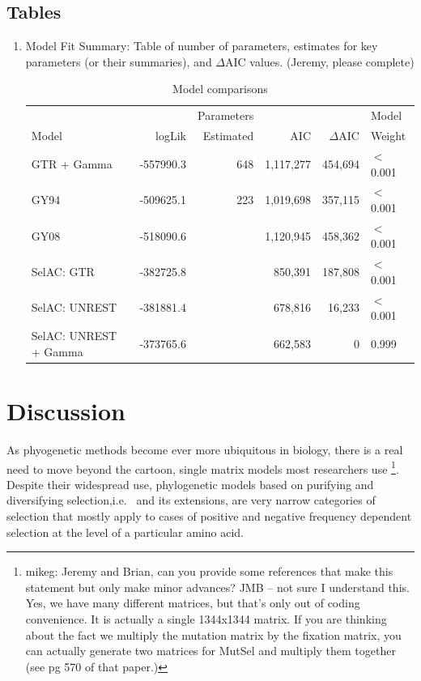 \documentclass{article}
\newcommand{\DeltaAIC}{\ensuremath{\Delta\text{AIC}}\xspace}
\begin{document}
\subsection*{Tables}
\begin{enumerate}
\item Model Fit Summary:
  Table of number of parameters,
  estimates for key parameters (or their summaries), and \DeltaAIC
  values.
  (Jeremy, please complete)
  \begin{table}
    \begin{tabular}{lrrrrl}
      &          &Parameters &          &        & Model\\
      Model                 & logLik   & Estimated &     AIC& \DeltaAIC&  Weight\\\hline
      GTR + Gamma           & -557990.3&        648& 1,117,277& 454,694&$<$0.001\\
      GY94                  & -509625.1&        223& 1,019,698& 357,115&$<$0.001\\
      GY08                  & -518090.6&           & 1,120,945& 458,362&$<$0.001\\
      SelAC: GTR            & -382725.8&           &   850,391& 187,808&$<$0.001\\
      SelAC: UNREST         & -381881.4&           &   678,816&  16,233&$<$0.001\\
      SelAC: UNREST + Gamma & -373765.6&           &   662,583&       0& 0.999
    \end{tabular}
    \caption{Model comparisons}\label{table:modelFits}
  \end{table}
\end{enumerate}
\section*{Discussion}
As phyogenetic methods become ever more ubiquitous in biology, there is a real need to move beyond the cartoon, single matrix models most researchers use \citep{GoldmanEtAl1996,ThorneEtAl1996,GoldmanEtAl1998,HalpernAndBruno1998}
  \footnote{mikeg: Jeremy and Brian, can you provide some references that make this statement but only make minor advances? JMB -- not sure I understand this. Yes, we have many different matrices, but that's only out of coding convenience. It is actually a single 1344x1344 matrix. If you are thinking about the fact we multiply the mutation matrix by the fixation matrix, you can actually generate two matrices for MutSel and multiply them together (see pg 570 of that paper.)}.
Despite their widespread use, phylogenetic models based on purifying and diversifying selection,i.e.~\citet{GoldmanAndYang1994} and its extensions, are very narrow categories of selection that mostly apply to cases of positive and negative frequency dependent selection at the level of a particular amino acid.
\end{document}

